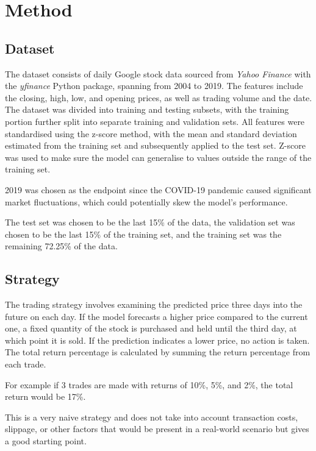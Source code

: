 \section{Method} \label{sec:method}

\subsection{Dataset}

The dataset consists of daily Google stock data sourced from \textit{Yahoo Finance}\cite{goog} with the \textit{yfinance} Python package\cite{yfinance}, spanning from 2004 to 2019. The features include the closing, high, low, and opening prices, as well as trading volume and the date. The dataset was divided into training and testing subsets, with the training portion further split into separate training and validation sets. All features were standardised using the z-score method, with the mean and standard deviation estimated from the training set and subsequently applied to the test set. Z-score was used to make sure the model can generalise to values outside the range of the training set.

2019 was chosen as the endpoint since the COVID-19 pandemic caused significant market fluctuations, which could potentially skew the model’s performance. 

The test set was chosen to be the last 15\% of the data, the validation set was chosen to be the last 15\% of the training set, and the training set was the remaining 72.25\% of the data.

\subsection{Strategy}

The trading strategy involves examining the predicted price three days into the future on each day. If the model forecasts a higher price compared to the current one, a fixed quantity of the stock is purchased and held until the third day, at which point it is sold. If the prediction indicates a lower price, no action is taken. The total return percentage is calculated by summing the return percentage from each trade.

For example if 3 trades are made with returns of 10\%, 5\%, and 2\%, the total return would be 17\%.

This is a very naive strategy and does not take into account transaction costs, slippage, or other factors that would be present in a real-world scenario but gives a good starting point.

